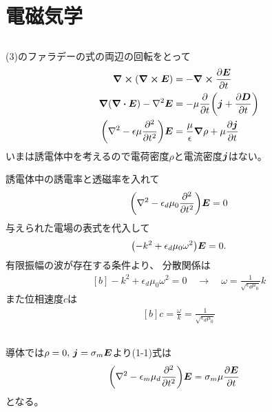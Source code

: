 \documentclass[../../master.tex]{subfiles}
\begin{document}
\section{電磁気学}
\subsection{}
(3)のファラデーの式の両辺の回転をとって
\begin{equation}\begin{aligned}[b]
    \curl(\curl{\vb*{E}})
        &= -\curl \pdv{\vb*{E}}{t}\\
    \grad(\div{\vb*{E}})-\laplacian{\vb*{E}}
        &= -\mu\pdv{t}\qty(\vb*{j}+\pdv{\vb*{D}}{t})\\
    \qty(\laplacian-\epsilon\mu\pdv[2]{t})\vb*{E}
        &= \frac{\mu}{\epsilon}\grad{\rho}+\mu\pdv{\vb*{j}}{t}
\end{aligned}\end{equation}
いまは誘電体中を考えるので電荷密度\(\rho\)と電流密度\(\vb*{j}\)はない。

誘電体中の誘電率と透磁率を入れて
\begin{equation}\begin{aligned}[b]
    \qty(\laplacian-\epsilon_d\mu_0\pdv[2]{t})\vb*{E} = 0
\end{aligned}\end{equation}
与えられた電場の表式を代入して
\begin{equation}\begin{aligned}[b]
    \qty(-k^2+\epsilon_d\mu_0\omega^2)\vb*{E}=0.
\end{aligned}\end{equation}
有限振幅の波が存在する条件より、
分散関係は
\begin{equation}\begin{aligned}[b]
    -k^2+\epsilon_d\mu_0\omega^2 = 0 \quad \rightarrow \quad
    \omega = \frac{1}{\sqrt{\epsilon_d\mu_0}}k
\end{aligned}\end{equation}
また位相速度\(c\)は
\begin{equation}\begin{aligned}[b]
    c = \frac{\omega}{k} = \frac{1}{\sqrt{\epsilon_d\mu_0}}
\end{aligned}\end{equation}

\subsection{}
導体では\(\rho=0,\,\vb*{j}=\sigma_m \vb*{E}\)より(1-1)式は
\begin{equation}\begin{aligned}[b]
    \qty(\laplacian-\epsilon_m\mu_d\pdv[2]{t})\vb*{E}
        &= \sigma_m\mu\pdv{\vb*{E}}{t}
\end{aligned}\end{equation}
となる。
\end{document}
